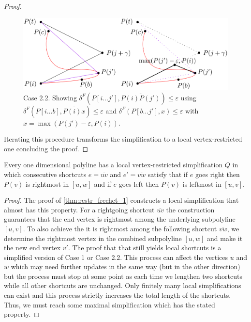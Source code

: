 \begin{proof}
	\begin{figure}[b]
		\centering
		\includegraphics[scale=0.15]{./figures/case2-2.png}
		\caption{Case 2.2. Showing \(\delta^F(P[i \dots j'], \overline{P(i)P(j')}) \leq \varepsilon\) using \(\delta^F(P[i \dots b], \overline{P(i)x}) \leq \varepsilon\) and \(\delta^F(P[b \dots j'], x) \leq \varepsilon\) with \(x = \max(P(j')-\varepsilon, P(i))\).}
		\label{fig:case22}
	\end{figure}

	Iterating this procedure transforms the simplification to a local vertex-restricted one concluding the proof.
\end{proof}

\begin{corollary}\label{cor:local_extremal}
	Every one dimensional polyline has a local vertex-restricted simplification \(Q\) in which consecutive shortcuts \(e=\overline{uv}\) and \(e'=\overline{vw}\) satisfy that if \(e\) goes right then \(P(v)\) is rightmost in \([u, w]\) and if \(e\) goes left then \(P(v)\) is leftmost in \([u, v]\).
\end{corollary}

\begin{proof}
	The proof of \cref{thm:restr_frechet_1} constructs a local simplification that almost has this property. For a rightgoing shortcut \(\overline{uv}\) the construction guarantees that the end vertex is rightmost among the underlying subpolyline \([u, v]\). To also achieve the it is rightmost among the following shortcut \(\overline{vw}\), we determine the rightmost vertex in the combined subpolyline \([u, w]\) and make it the new end vertex \(v'\). The proof that that still yields local shortcuts is a simplified version of Case 1 or Case 2.2. This process can affect the vertices \(u\) and \(w\) which may need further updates in the same way (but in the other direction) but the process must stop at some point as each time we lengthen two shortcuts while all other shortcuts are unchanged. Only finitely many local simplifications can exist and this process strictly increases the total length of the shortcuts. Thus, we must reach some maximal simplification which has the stated property.
\end{proof}

